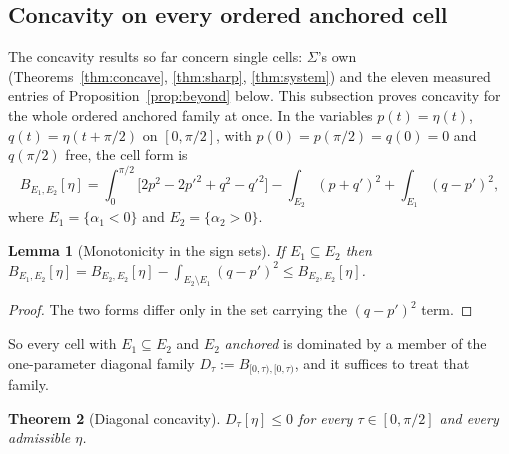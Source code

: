 \documentclass[11pt]{article}
\newtheorem{theorem}{Theorem}
\newtheorem{lemma}[theorem]{Lemma}
\theoremstyle{definition}
\newcommand{\Sig}{\Sigma}
\begin{document}
\subsection*{Concavity on every ordered anchored cell}

The concavity results so far concern single cells: $\Sig$'s own
(Theorems~\ref{thm:concave}, \ref{thm:sharp}, \ref{thm:system}) and the eleven measured
entries of Proposition~\ref{prop:beyond} below. This subsection proves concavity for the
whole ordered anchored family at once. In the variables $p(t)=\eta(t)$,
$q(t)=\eta(t+\pi/2)$ on $[0,\pi/2]$, with $p(0)=p(\pi/2)=q(0)=0$ and $q(\pi/2)$ free, the
cell form is
\begin{equation}\label{eq:cellform}
  B_{E_1,E_2}[\eta]=\int_0^{\pi/2}\bigl[2p^2-2p'^2+q^2-q'^2\bigr]
  -\int_{E_2}(p+q')^2+\int_{E_1}(q-p')^2 ,
\end{equation}
where $E_1=\{\alpha_1<0\}$ and $E_2=\{\alpha_2>0\}$.

\begin{lemma}[Monotonicity in the sign sets]\label{lem:mono}
If $E_1\subseteq E_2$ then
$B_{E_1,E_2}[\eta]=B_{E_2,E_2}[\eta]-\int_{E_2\setminus E_1}(q-p')^2\le B_{E_2,E_2}[\eta]$.
\end{lemma}

\begin{proof}
The two forms differ only in the set carrying the $(q-p')^2$ term.
\end{proof}

So every cell with $E_1\subseteq E_2$ and $E_2$ \emph{anchored} is dominated by a member
of the one-parameter diagonal family
$D_\tau:=B_{[0,\tau),[0,\tau)}$, and it suffices to treat that family.

\begin{theorem}[Diagonal concavity]\label{thm:diag}
$D_\tau[\eta]\le0$ for every $\tau\in[0,\pi/2]$ and every admissible $\eta$.
\end{theorem}
\end{document}
